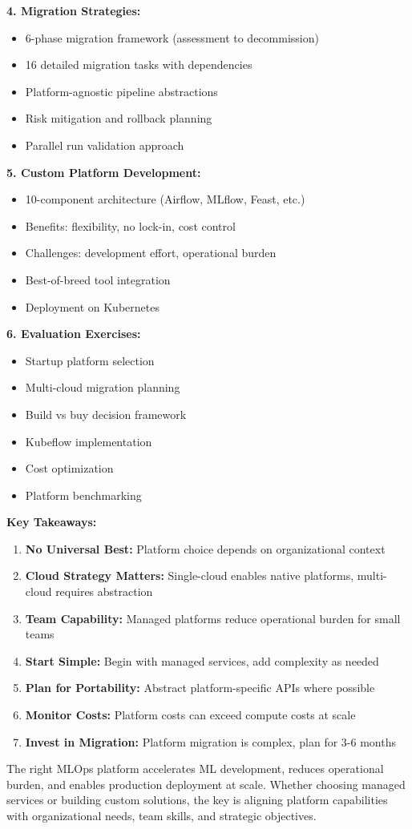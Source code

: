 \textbf{4. Migration Strategies:}
\begin{itemize}
    \item 6-phase migration framework (assessment to decommission)
    \item 16 detailed migration tasks with dependencies
    \item Platform-agnostic pipeline abstractions
    \item Risk mitigation and rollback planning
    \item Parallel run validation approach
\end{itemize}

\textbf{5. Custom Platform Development:}
\begin{itemize}
    \item 10-component architecture (Airflow, MLflow, Feast, etc.)
    \item Benefits: flexibility, no lock-in, cost control
    \item Challenges: development effort, operational burden
    \item Best-of-breed tool integration
    \item Deployment on Kubernetes
\end{itemize}

\textbf{6. Evaluation Exercises:}
\begin{itemize}
    \item Startup platform selection
    \item Multi-cloud migration planning
    \item Build vs buy decision framework
    \item Kubeflow implementation
    \item Cost optimization
    \item Platform benchmarking
\end{itemize}

\textbf{Key Takeaways:}

\begin{enumerate}
    \item \textbf{No Universal Best:} Platform choice depends on organizational context
    \item \textbf{Cloud Strategy Matters:} Single-cloud enables native platforms, multi-cloud requires abstraction
    \item \textbf{Team Capability:} Managed platforms reduce operational burden for small teams
    \item \textbf{Start Simple:} Begin with managed services, add complexity as needed
    \item \textbf{Plan for Portability:} Abstract platform-specific APIs where possible
    \item \textbf{Monitor Costs:} Platform costs can exceed compute costs at scale
    \item \textbf{Invest in Migration:} Platform migration is complex, plan for 3-6 months
\end{enumerate}

The right MLOps platform accelerates ML development, reduces operational burden, and enables production deployment at scale. Whether choosing managed services or building custom solutions, the key is aligning platform capabilities with organizational needs, team skills, and strategic objectives.

